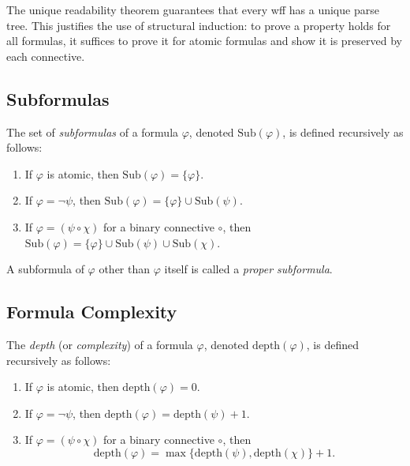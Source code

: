\begin{remark}
The unique readability theorem guarantees that every wff has a unique parse tree.
This justifies the use of structural induction: to prove a property holds for
all formulas, it suffices to prove it for atomic formulas and show it is
preserved by each connective.
\end{remark}

\subsection{Subformulas}

\begin{definition}[Subformula]
The set of \emph{subformulas} of a formula $\varphi$, denoted
$\mathrm{Sub}(\varphi)$, is defined recursively as follows:

\begin{enumerate}
  \item If $\varphi$ is atomic, then $\mathrm{Sub}(\varphi) = \{\varphi\}$.

  \item If $\varphi = \neg\psi$, then
  $\mathrm{Sub}(\varphi) = \{\varphi\} \cup \mathrm{Sub}(\psi)$.

  \item If $\varphi = (\psi \circ \chi)$ for a binary connective $\circ$, then
  $\mathrm{Sub}(\varphi) = \{\varphi\} \cup \mathrm{Sub}(\psi) \cup \mathrm{Sub}(\chi)$.
\end{enumerate}

A subformula of $\varphi$ other than $\varphi$ itself is called a \emph{proper
subformula}.
\end{definition}

\subsection{Formula Complexity}

\begin{definition}
The \emph{depth} (or \emph{complexity}) of a formula $\varphi$, denoted
$\mathrm{depth}(\varphi)$, is defined recursively as follows:

\begin{enumerate}
  \item If $\varphi$ is atomic, then $\mathrm{depth}(\varphi) = 0$.

  \item If $\varphi = \neg\psi$, then
  $\mathrm{depth}(\varphi) = \mathrm{depth}(\psi) + 1$.

  \item If $\varphi = (\psi \circ \chi)$ for a binary connective $\circ$, then
  \[
  \mathrm{depth}(\varphi) = \max\{\mathrm{depth}(\psi), \mathrm{depth}(\chi)\} + 1.
  \]
\end{enumerate}
\end{definition}

